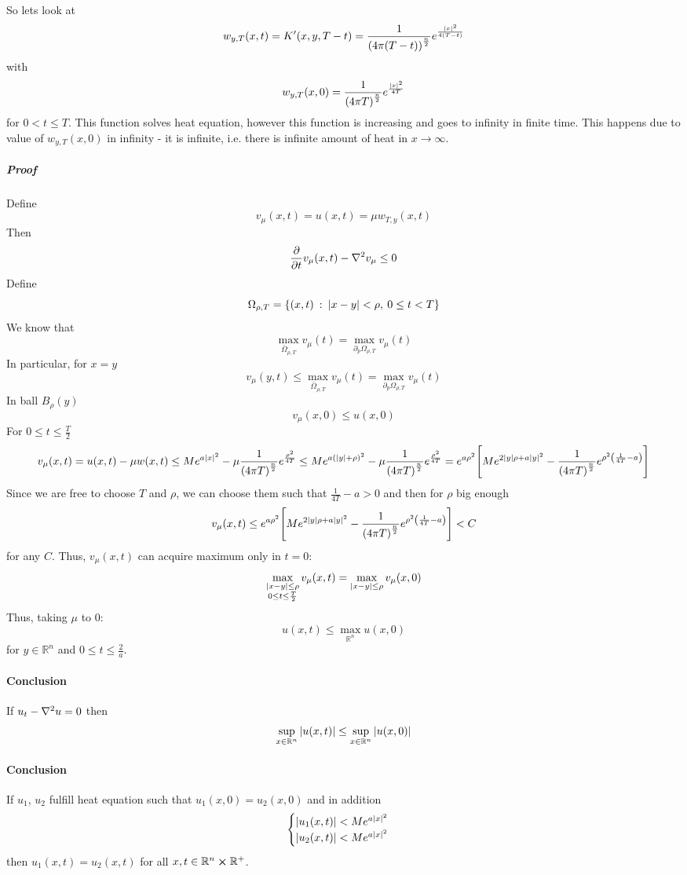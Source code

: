 So lets look at
$$w_{y,T}(x,t) = K'(x,y,T-t) = \frac{1}{\qty(4\pi (T-t))^{\frac{n}{2}}} e^{\frac{\abs{x}^2}{4(T-t)}}$$
with
$$w_{y,T}(x,0) = \frac{1}{\qty(4\pi T)^{\frac{n}{2}}} e^{\frac{\abs{x}^2}{4T}} $$
for $0<t\leq T$.
This function solves heat equation, however this function is increasing and goes to infinity in finite time. This happens due to value of $w_{y,T}(x,0) $ in infinity - it is infinite, i.e. there is infinite amount of heat in $x\to \infty$.
\subparagraph{Proof}
Define
$$v_\mu(x,t) = u(x,t) = \mu w_{T,y} (x,t)$$
Then
$$\pdv{t} v_\mu(x,t) - \laplacian{v_\mu} \leq 0$$
Define 
$$\Omega_{\rho, T} = \left\{ (x,t)  \: : \: \abs{x-y} < \rho, \: 0 \leq t < T \right\}$$
We know that
$$\max\limits_{ \bar{\Omega}_{\rho,T}} v_\mu(t) = \max\limits_{ \partial_p\Omega_{\rho,T}} v_\mu(t)$$
In particular, for $x=y$
$$v_\mu(y,t) \leq \max\limits_{ \bar{\Omega}_{\rho,T}} v_\mu(t) = \max\limits_{ \partial_p\Omega_{\rho,T}} v_\mu(t)$$
In ball $B_{\rho}(y)$
$$v_\mu (x,0) \leq u(x,0)$$
For $0\leq t\leq \frac{T}{2}$
$$v_{\mu}(x,t) = u(x,t) - \mu w(x, t) \leq Me^{a\abs{x}^2} - \mu \frac{1}{\qty(4\pi T)^{\frac{n}{2}}} e^{\frac{\rho^2}{4T}} \leq Me^{a\qty(\abs{y}+\rho)^2} - \mu \frac{1}{\qty(4\pi T)^{\frac{n}{2}}} e^{\frac{\rho^2}{4T}}= e^{a\rho^2} \qty[Me^{2\abs{y}\rho + a\abs{y}^2} - \frac{1}{\qty(4\pi T)^{\frac{n}{2}}} e^{\rho^2 \qty(\frac{1}{4T}-a)}]$$
Since we are free to choose $T$ and $\rho$, we can choose them such that $\frac{1}{4T}-a>0$ and then for $\rho$ big enough
$$v_{\mu}(x,t) \leq e^{a\rho^2} \qty[Me^{2\abs{y}\rho + a\abs{y}^2} - \frac{1}{\qty(4\pi T)^{\frac{n}{2}}} e^{\rho^2 \qty(\frac{1}{4T}-a)}] < C$$
for any $C$.
Thus, $v_\mu(x,t)$ can acquire maximum only in $t=0$:
$$\max\limits_{\substack{\abs{x-y}\leq\rho \\ 0\leq t\leq \frac{T}{2}}} v_\mu(x,t) = \max\limits_{\abs{x-y}\leq\rho } v_\mu(x,0)$$
Thus, taking $\mu$ to $0$:
$$u(x,t) \leq \max_{\mathbb{R}^n} u(x,0)$$
for $y \in \mathbb{R}^n$ and $0\leq t \leq \frac{2}{a}$.
\paragraph{Conclusion}
If $u_t - \laplacian{u} = 0$ then
$$\sup\limits_{x\in \mathbb{R}^n} \abs{u(x,t) } \leq \sup\limits_{x\in \mathbb{R}^n} \abs{u(x,0)}$$
\paragraph{Conclusion}
If $u_1$, $u_2$ fulfill heat equation such that $u_1(x,0) = u_2(x,0)$ and in addition
$$\begin{cases}
\abs{u_1(x,t)} < Me^{a\abs{x}^2}\\
\abs{u_2(x,t)} < Me^{a\abs{x}^2}\\
\end{cases}$$
then $u_1(x,t) = u_2(x,t)$ for all $x,t \in \mathbb{R}^n \cross \mathbb{R}^+$.

